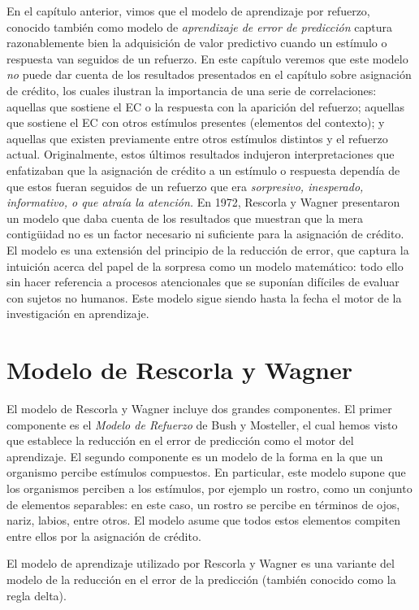 \documentclass[
  letterpaper,
]{book}
\begin{document}
En el capítulo anterior, vimos que el modelo de aprendizaje por
refuerzo, conocido también como modelo de \emph{aprendizaje de error de
predicción} captura razonablemente bien la adquisición de valor
predictivo cuando un estímulo o respuesta van seguidos de un refuerzo.
En este capítulo veremos que este modelo \emph{no} puede dar cuenta de
los resultados presentados en el capítulo sobre asignación de crédito,
los cuales ilustran la importancia de una serie de correlaciones:
aquellas que sostiene el EC o la respuesta con la aparición del
refuerzo; aquellas que sostiene el EC con otros estímulos presentes
(elementos del contexto); y aquellas que existen previamente entre otros
estímulos distintos y el refuerzo actual. Originalmente, estos últimos
resultados indujeron interpretaciones que enfatizaban que la asignación
de crédito a un estímulo o respuesta dependía de que estos fueran
seguidos de un refuerzo que era \emph{sorpresivo, inesperado,
informativo, o que atraía la atención. } En 1972, Rescorla y Wagner
presentaron un modelo que daba cuenta de los resultados que muestran que
la mera contigüidad no es un factor necesario ni suficiente para la
asignación de crédito. El modelo es una extensión del principio de la
reducción de error, que captura la intuición acerca del papel de la
sorpresa como un modelo matemático: todo ello sin hacer referencia a
procesos atencionales que se suponían difíciles de evaluar con sujetos
no humanos. Este modelo sigue siendo hasta la fecha el motor de la
investigación en aprendizaje.

\section{Modelo de Rescorla y Wagner}\label{modelo-de-rescorla-y-wagner}

El modelo de Rescorla y Wagner incluye dos grandes componentes. El
primer componente es el \emph{Modelo de Refuerzo} de Bush y Mosteller,
el cual hemos visto que establece la reducción en el error de predicción
como el motor del aprendizaje. El segundo componente es un modelo de la
forma en la que un organismo percibe estímulos compuestos. En
particular, este modelo supone que los organismos perciben a los
estímulos, por ejemplo un rostro, como un conjunto de elementos
separables: en este caso, un rostro se percibe en términos de ojos,
nariz, labios, entre otros. El modelo asume que todos estos elementos
compiten entre ellos por la asignación de crédito.

El modelo de aprendizaje utilizado por Rescorla y Wagner es una variante
del modelo de la reducción en el error de la predicción (también
conocido como la regla delta).
\end{document}
